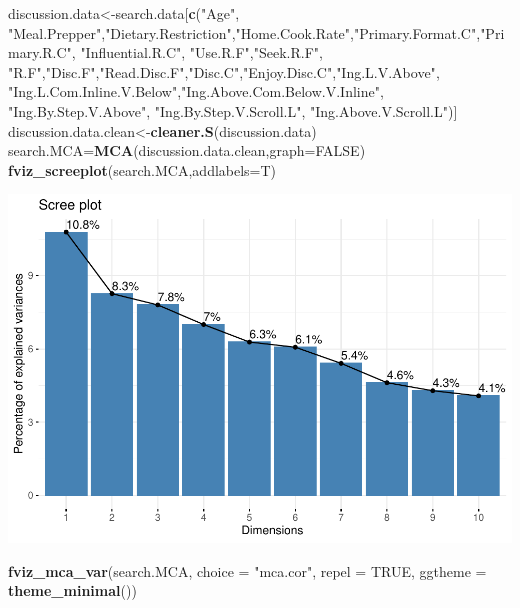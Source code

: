 \documentclass[
]{article}
\newenvironment{Shaded}{\begin{snugshade}}{\end{snugshade}}
\newcommand{\DataTypeTok}[1]{\textcolor[rgb]{0.13,0.29,0.53}{#1}}
\newcommand{\KeywordTok}[1]{\textcolor[rgb]{0.13,0.29,0.53}{\textbf{#1}}}
\newcommand{\NormalTok}[1]{#1}
\newcommand{\OtherTok}[1]{\textcolor[rgb]{0.56,0.35,0.01}{#1}}
\newcommand{\StringTok}[1]{\textcolor[rgb]{0.31,0.60,0.02}{#1}}
\begin{document}
\begin{Shaded}
\begin{Highlighting}[]
\NormalTok{discussion.data<-search.data[}\KeywordTok{c}\NormalTok{(}\StringTok{"Age"}\NormalTok{, }\StringTok{"Meal.Prepper"}\NormalTok{,}\StringTok{"Dietary.Restriction"}\NormalTok{,}\StringTok{"Home.Cook.Rate"}\NormalTok{,}\StringTok{"Primary.Format.C"}\NormalTok{,}\StringTok{"Primary.R.C"}\NormalTok{, }\StringTok{"Influential.R.C"}\NormalTok{, }
            \StringTok{"Use.R.F"}\NormalTok{,}\StringTok{"Seek.R.F"}\NormalTok{, }\StringTok{"R.F"}\NormalTok{,}\StringTok{"Disc.F"}\NormalTok{,}\StringTok{"Read.Disc.F"}\NormalTok{,}\StringTok{"Disc.C"}\NormalTok{,}\StringTok{"Enjoy.Disc.C"}\NormalTok{,}\StringTok{"Ing.L.V.Above"}\NormalTok{,}
            \StringTok{"Ing.L.Com.Inline.V.Below"}\NormalTok{,}\StringTok{"Ing.Above.Com.Below.V.Inline"}\NormalTok{,  }\StringTok{"Ing.By.Step.V.Above"}\NormalTok{,  }\StringTok{"Ing.By.Step.V.Scroll.L"}\NormalTok{,}
            \StringTok{"Ing.Above.V.Scroll.L"}\NormalTok{)]}
\NormalTok{discussion.data.clean<-}\KeywordTok{cleaner.S}\NormalTok{(discussion.data)}
\NormalTok{search.MCA=}\KeywordTok{MCA}\NormalTok{(discussion.data.clean,}\DataTypeTok{graph=}\OtherTok{FALSE}\NormalTok{)}
\KeywordTok{fviz_screeplot}\NormalTok{(search.MCA,}\DataTypeTok{addlabels=}\NormalTok{T)}
\end{Highlighting}
\end{Shaded}

\includegraphics{Average-User-MCA_files/figure-latex/mca social all-1.pdf}

\begin{Shaded}
\begin{Highlighting}[]
\KeywordTok{fviz_mca_var}\NormalTok{(search.MCA, }\DataTypeTok{choice =} \StringTok{"mca.cor"}\NormalTok{, }\DataTypeTok{repel =} \OtherTok{TRUE}\NormalTok{,}
             \DataTypeTok{ggtheme =} \KeywordTok{theme_minimal}\NormalTok{())}
\end{Highlighting}
\end{Shaded}
\end{document}
